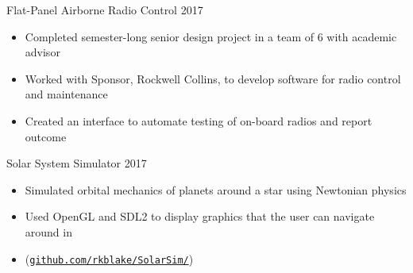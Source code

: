 \documentclass[line,margin]{res}
\begin{document}
\begin{resume}
\vspace{-8pt}
Flat-Panel Airborne Radio Control
\hfill 2017
	\begin{itemize} \itemsep -2pt
		\item Completed semester-long senior design project in a team of 6 with academic advisor
		\item Worked with Sponsor, Rockwell Collins, to develop software for radio control and maintenance
		\item Created an interface to automate testing of on-board radios and report outcome
	\end{itemize}

\vspace{-8pt}
Solar System Simulator
\hfill 2017
	\begin{itemize} \itemsep -2pt
		\item Simulated orbital mechanics of planets around a star using Newtonian physics
		\item Used OpenGL and SDL2 to display graphics that the user can navigate around in
		\item (\href{https://github.com/rkblake/SolarSim/}{\texttt{github.com/rkblake/SolarSim/}})
	\end{itemize}





\end{resume}
\end{document}
